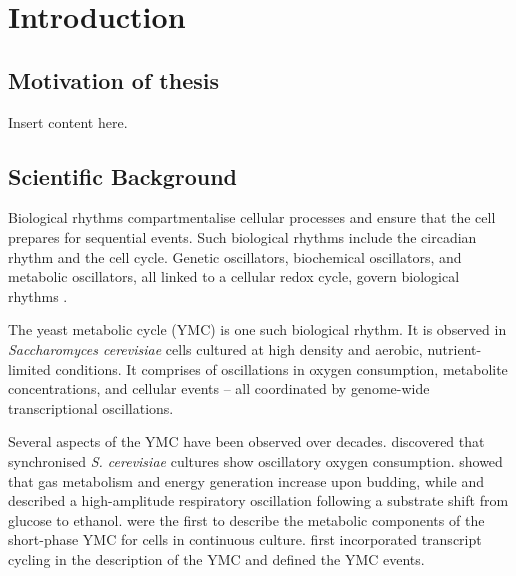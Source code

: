 
\chapter{Introduction}

\section{Motivation of thesis}

Insert content here.

\section{Scientific Background}
\label{sec:intro-bg}


Biological rhythms compartmentalise cellular processes and ensure that the cell prepares for sequential events.
Such biological rhythms include the circadian rhythm and the cell cycle.
Genetic oscillators, biochemical oscillators, and metabolic oscillators, all linked to a cellular redox cycle, govern biological rhythms \citep{mellorMolecularBasisMetabolic2016}.



The yeast metabolic cycle (YMC) is one such biological rhythm.
It is observed in \emph{Saccharomyces cerevisiae} cells cultured at high density and aerobic, nutrient-limited conditions.
It comprises of oscillations in oxygen consumption, metabolite concentrations, and cellular events -- all coordinated by genome-wide transcriptional oscillations.

Several aspects of the YMC have been observed over decades.
\citet{nosohSYNCHRONIZATIONBUDDINGCYCLE1962} discovered that synchronised \emph{S. cerevisiae} cultures show oscillatory oxygen consumption.
\citet{kasparvonmeyenburgEnergeticsBuddingCycle1969} showed that gas metabolism and energy generation increase upon budding, while and \citet{mochanRespiratoryOscillationsAdapting1973} described a high-amplitude respiratory oscillation following a substrate shift from glucose to ethanol.
\citet{satroutdinovOscillatoryMetabolismSaccharomyces1992} were the first to describe the metabolic components of the short-phase YMC for cells in continuous culture.
\citet{tuLogicYeastMetabolic2005} first incorporated transcript cycling in the description of the YMC and defined the YMC events.

